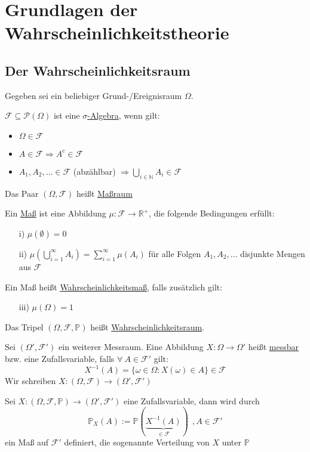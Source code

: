 \section{Grundlagen der Wahrscheinlichkeitstheorie}\label{ueb1}
\subsection{Der Wahrscheinlichkeitsraum}
Gegeben sei ein beliebiger Grund-/Ereignisraum $ \Omega $.
\begin{Def}
$\mathcal F\subseteq \mathcal{P}(\Omega)$ ist eine \underline{$ \sigma $-Algebra}, wenn gilt:
\begin{itemize}
\item $ \Omega\in\mathcal F $
\item $ A\in\mathcal F\Longrightarrow A^{c}\in\mathcal F $
\item $ A_{1},A_{2},\hdots\in\mathcal F $ (abzählbar) $ \Longrightarrow \bigcup\limits_{i\in\mathbb N} A_{i} \in\mathcal F$
\end{itemize}
Das Paar $ (\Omega,\mathcal F) $ heißt \underline{Maßraum}
\end{Def}
\begin{Def}
Ein \underline{Maß} ist eine Abbildung $ \mu:\mathcal{F}\to\mathbb R^{+} $, die folgende Bedingungen erfüllt:
\begin{itemize}
\item[i)] $ \mu(\emptyset)=0 $
\item[ii)] $ \mu(\bigcup\limits_{i=1}^{\infty}A_{i})=\sum\limits_{i=1}^{\infty}\mu(A_{i})  $ für alle Folgen $ A_{1},A_{2},\hdots $ disjunkte Mengen aus $ \mathcal F $
\end{itemize}
Ein Maß heißt \underline{Wahrscheinlichkeitsmaß}, falls zusätzlich gilt:
\begin{itemize}
\item[iii)] $ \mu(\Omega)=1 $
\end{itemize}
Das Tripel $ (\Omega,\mathcal F,\mathbb P) $ heißt \underline{Wahrscheinlichkeitsraum}.
\end{Def}
\begin{Def}
Sei $ (\Omega',\mathcal F') $ ein weiterer Messraum. Eine Abbildung $ X:\Omega\to\Omega' $ heißt \underline{messbar} bzw. eine Zufallsvariable, falls $ \forall \ A\in\mathcal F' $ gilt:
\begin{equation*}
X^{-1}(A)=\{ \omega\in\Omega: X(\omega)\in A \} \in\mathcal F
\end{equation*}
Wir schreiben $ X:(\Omega,\mathcal F)\to (\Omega',\mathcal F') $
\end{Def}
\begin{Def}
Sei $ X:(\Omega,\mathcal F,\mathbb P)\to (\Omega',\mathcal F') $ eine Zufallsvariable, dann wird durch
\[ \mathbb P_{X}(A):=\mathbb{P}(\underbrace{X^{-1}(A)}_{\in\mathcal F}) \ \ ,A\in\mathcal F' \]
ein Maß auf $ \mathcal F' $ definiert, die sogenannte Verteilung von $ X $ unter $ \mathbb{P} $
\end{Def}
